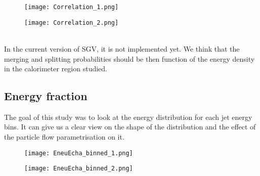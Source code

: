 \documentclass[a4paper,12pt]{article}
\begin{document}
\noindent
\begin{minipage}{\linewidth}
\centering
\begin{minipage}{0.4\linewidth}
\begin{figure}[H]
    \texttt{[image: Correlation\_1.png]} 
\end{figure}
\end{minipage}
      \hspace{0.05\linewidth}
      \begin{minipage}{0.4\linewidth}
\begin{figure}[H]
    \texttt{[image: Correlation\_2.png]} 
\end{figure}
\end{minipage}
   \label{fig:jet_track_level}
\end{minipage}\\[0.5cm]

In the current version of SGV, it is not implemented yet. We think that the merging and splitting probabilities should be then function of the energy density in the calorimeter region studied.

\subsection{Energy fraction}

The goal of this study was to look at the energy distribution for each jet energy bins. It can give us a clear view on the shape of the distribution and the effect of the particle flow parametrisation on it.

\noindent
\begin{minipage}{\linewidth}
\centering
\begin{minipage}{0.4\linewidth}
\begin{figure}[H]
    \texttt{[image: EneuEcha\_binned\_1.png]}
\end{figure}
\end{minipage}
      \hspace{0.05\linewidth}
      \begin{minipage}{0.4\linewidth}
\begin{figure}[H]
    \texttt{[image: EneuEcha\_binned\_2.png]} 
\end{figure}
\end{minipage}
   \label{fig:energy_distrib}
\end{minipage}\\[0.5cm]
\end{document}
